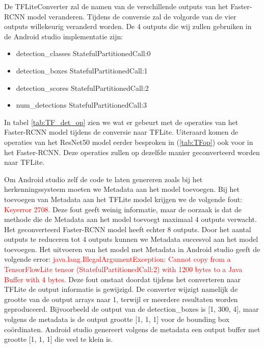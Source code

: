 De TFLiteConverter zal de namen van de verschillende outputs van het Faster-RCNN model veranderen.
Tijdens de conversie zal de volgorde van de vier outputs willekeurig veranderd worden.
De 4 outputs die wij zullen gebruiken in de Android studio implementatie zijn:

\begin{itemize}
	\item detection\_classes \textrightarrow StatefulPartitionedCall:0
	\item detection\_boxes \textrightarrow StatefulPartitionedCall:1
	\item detection\_scores \textrightarrow StatefulPartitionedCall:2
    \item num\_detections \textrightarrow StatefulPartitionedCall:3
\end{itemize}

In tabel \ref{tab:TF_det_op} zien we wat er gebeurt met de operaties van het Faster-RCNN model tijdens de conversie naar TFLite.
Uiteraard komen de operaties van het ResNet50 model eerder besproken in (\ref{tab:TFop}) ook voor in het Faster-RCNN.
Deze operaties zullen op dezelfde manier geconverteerd worden naar TFLite.

Om Android studio zelf de code te laten genereren zoals bij het herkenningssysteem moeten we Metadata aan het model toevoegen. 
Bij het toevoegen van Metadata aan het TFLite model krijgen we de volgende fout: \textcolor{red}{Keyerror 2708.}
Deze fout geeft weinig informatie, maar de oorzaak is dat de methode die de Metadata aan het model toevoegt maximaal 4 outputs verwacht.
Het geconverteerd Faster-RCNN model heeft echter 8 outputs.
Door het aantal outputs te reduceren tot 4 outputs kunnen we Metadata succesvol aan het model toevoegen. %
Het uitvoeren van het model met Metadata in Android studio geeft de volgende error: 
\textcolor{red}{java.lang.IllegalArgumentException: Cannot copy from a TensorFlowLite tensor (StatefulPartitionedCall:2) with 1200 bytes to a Java Buffer with 4 bytes.}
\newline
Deze fout onstaat doordat tijdens het converteren naar TFLite de output informatie is gewijzigd.
De converter wijzigt namelijk de grootte van de output arrays naar 1, terwijl er meerdere resultaten worden geproduceerd.
Bijvoorbeeld de output van de detection\_boxes is [1, 300, 4], maar volgens de metadata is de output grootte [1, 1, 1] voor de bounding box co\"ordinaten.
Android studio genereert volgens de metadata een output buffer met grootte [1, 1, 1] die veel te klein is.


